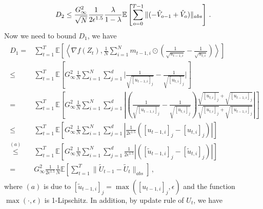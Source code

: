 \documentclass[11pt]{article}
\begin{document}
\begin{equation}\notag
D_2 \leq  \frac{G_{\infty}^2}{\sqrt{N}}\frac{1}{2\epsilon^{1.5}} \frac{\lambda}{1-\lambda}   \mathbb E \left[ \sum_{o=0}^{T-1}     \|    (- \hat V_{o-1} + \hat V_{o} ) \|_{abs} \right]  \, .
\end{equation}
Now we need to bound $D_1$, we have
\begin{align}\label{eq: T_1}
\begin{split}
D_1 = & \sum_{t=1}^T   \mathbb E \left [\left \langle \nabla f( Z_{t}) , \frac{1}{N} \sum_{i=1}^N m_{t-1	,i} \odot (\frac{1}{\sqrt{u_{t-1,i}}} - \frac{1}{\sqrt{u_{t,i}}}) \right \rangle \right]  \\
\leq & \sum_{t=1}^T   \mathbb E \left [   G_{\infty}^2 \frac{1}{N} \sum_{i=1}^N \sum_{j=1}^d \bigg|\frac{1}{\sqrt{[u_{t-1,i}]_j}} - \frac{1}{\sqrt{[u_{t,i}]_j}}\bigg|   \right]  \\
= & \sum_{t=1}^T   \mathbb E \left [   G_{\infty}^2 \frac{1}{N} \sum_{i=1}^N \sum_{j=1}^d \left|\left(\frac{1}{\sqrt{[u_{t-1,i}]_j}} - \frac{1}{\sqrt{[u_{t,i}]_j}}\right) \frac{\sqrt{[u_{t,i}]_j}+\sqrt{[u_{t-1,i}]_j}}{\sqrt{[u_{t,i}]_j}+\sqrt{[u_{t-1,i}]_j}}\right|    \right]  \\
\leq & \sum_{t=1}^T   \mathbb E \left [   G_{\infty}^2 \frac{1}{N} \sum_{i=1}^N \sum_{j=1}^d \left|\frac{1}{2\epsilon^{1.5}}\left({{[u_{t-1,i}]_j}} - {{[u_{t,i}]_j}}\right) \right|    \right]  \\
\overset{(a)}{\leq} & \sum_{t=1}^T   \mathbb E \left [   G_{\infty}^2 \frac{1}{N} \sum_{i=1}^N \sum_{j=1}^d\frac{1}{2\epsilon^{1.5}} \left|\left({{[\tilde u_{t-1,i}]_j}} - {{[\tilde u_{t,i}]_j}}\right) \right|    \right]  \\
= &  G_{\infty}^2 \frac{1}{2\epsilon^{1.5}} \frac{1}{N}   \mathbb E \left [  \sum_{t=1}^T   \|{{\tilde U_{t-1}}} - {{\tilde U_{t}}\|_{abs}}    \right] \, ,  
\end{split}
\end{align}
where $(a)$ is due to $[\tilde u_{t-1,i}]_j = \max ([u_{t-1,i}]_j,\epsilon)$ and the function $\max(\cdot,\epsilon)$ is 1-Lipschitz.
In addition, by update rule of $U_t$, we have 
\end{document}
